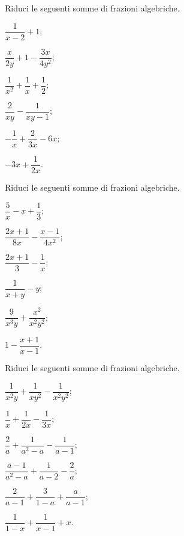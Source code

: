 \begin{esercizio}
\label{ese:14.23}
Riduci le seguenti somme di frazioni algebriche.
\begin{multicols}{3}
\begin{enumeratea}
 \item $\dfrac{1}{x-2}+1$;
 \item $\dfrac{x}{2y}+1-\dfrac{3x}{4y^{2}}$;
 \item $\dfrac{1}{x^{2}}+\dfrac{1}{x}+\dfrac{1}{2}$;
 \item $\dfrac{2}{xy}-\dfrac{1}{xy-1}$;
 \item $-{\dfrac{1}{x}}+\dfrac{2}{3x}-6x$;
 \item $-3x+\dfrac{1}{2x}$.
\end{enumeratea}
\end{multicols}
\end{esercizio}

\begin{esercizio}
\label{ese:14.24}
Riduci le seguenti somme di frazioni algebriche.
\begin{multicols}{3}
\begin{enumeratea}
 \item $\dfrac{5}{x}-x+\dfrac{1}{3}$;
 \item $\dfrac{2x+1}{8x}-\dfrac{x-1}{4x^{2}}$;
 \item $\dfrac{2x+1}{3}-\dfrac{1}{x}$;
 \item $\dfrac{1}{x+y}-y$;
 \item $\dfrac{9}{x^{3}y}+\dfrac{x^{2}}{x^{2}y^{2}}$;
 \item $1-\dfrac{x+1}{x-1}$.
\end{enumeratea}
\end{multicols}
\end{esercizio}

\begin{esercizio}[\Ast]
\label{ese:14.25}
Riduci le seguenti somme di frazioni algebriche.
\begin{multicols}{3}
\begin{enumeratea}
 \item $\dfrac{1}{x^{2}y}+\dfrac{1}{xy^{2}}-\dfrac{1}{x^{2}y^{2}}$;
 \item $\dfrac{1}{x}+\dfrac{1}{2x}-\dfrac{1}{3x}$;
 \item $\dfrac{2}{a}+\dfrac{1}{a^{{2}}-a}-\dfrac{1}{a-1}$;
 \item $\dfrac{a-1}{a^{2}-a}+\dfrac{1}{a-2}-\dfrac{2}{a}$;
 \item $\dfrac{2}{a-1}+\dfrac{3}{1-a}+\dfrac{a}{a-1}$;
 \item $\dfrac{1}{1-x}+\dfrac{1}{x-1}+x$.
\end{enumeratea}
\end{multicols}
\end{esercizio}

